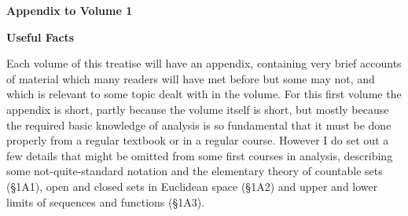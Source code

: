 
\def\chaptername{Appendix}
\def\sectionname{Introduction}

\gdef\topparagraph{}
\gdef\bottomparagraph{Appendix to Vol.\ 1 {\it intro.}}

\centerline{\bf Appendix to Volume 1}

\medskip

\centerline{\bf Useful Facts}

\medskip

Each volume of this treatise will have an appendix, containing very
brief accounts of material which many readers will have met before but
some may not, and which is relevant to some topic dealt with in the
volume.   For this first volume the appendix is short, partly because
the volume itself is short, but mostly because the required basic
knowledge of analysis is so fundamental that it must be done properly
from a regular textbook or in a regular course.   However I do set out a
few details that might be omitted from some first courses in analysis,
describing some not-quite-standard notation and the elementary theory of
countable sets (\S1A1), open and closed sets in Euclidean space (\S1A2)
and upper and lower limits of sequences and functions (\S1A3).

\discrpage

